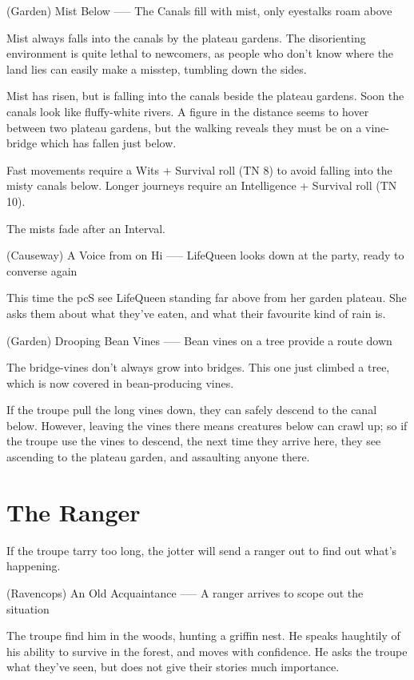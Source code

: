 (Garden) Mist Below
-----
{The Canals fill with mist, only eyestalks roam above}

Mist always falls into the canals by the plateau gardens.
The disorienting environment is quite lethal to newcomers, as people who don't know where the land lies can easily make a misstep, tumbling down the sides.

\begin{boxtext}
  Mist has risen, but is falling into the canals beside the plateau gardens.
  Soon the canals look like fluffy-white rivers.
  A figure in the distance seems to hover between two plateau gardens, but the walking reveals they must be on a vine-bridge which has fallen just below.
\end{boxtext}

Fast movements require a Wits + Survival roll (TN 8) to avoid falling into the misty canals below.
Longer journeys require an Intelligence + Survival roll (TN 10).

The mists fade after an Interval.

(Causeway) A Voice from on Hi
-----
{LifeQueen looks down at the party, ready to converse again}

This time the \gls{pc}S see LifeQueen standing far above from her garden plateau.
She asks them about what they've eaten, and what their favourite kind of rain is.

(Garden) Drooping Bean Vines
-----
{Bean vines on a tree provide a route down}

The bridge-vines don't always grow into bridges.
This one just climbed a tree, which is now covered in bean-producing vines.

If the troupe pull the long vines down, they can safely descend to the canal below.
However, leaving the vines there means creatures below can crawl up; so if the troupe use the vines to descend, the next time they arrive here, they see  ascending to the plateau garden, and assaulting anyone there.

\section{The Ranger}

If the troupe tarry too long, the \gls{jotter} will send a ranger out to find out what's happening.

(Ravencops) An Old Acquaintance
-----
{A ranger arrives to scope out the situation}

The troupe find him in the woods, hunting a griffin nest.
He speaks haughtily of his ability to survive in the forest, and moves with confidence.
He asks the troupe what they've seen, but does not give their stories much importance.


